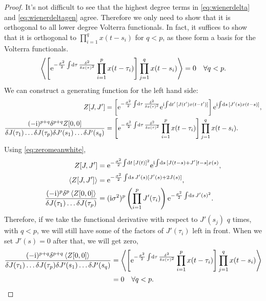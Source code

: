 \documentclass[12pt]{article}
\theoremstyle{slplain}
\theoremstyle{sldefinition}
\theoremstyle{remark}
\begin{document}
\begin{proof}
  It's not difficult to see that the highest degree terms in \eqref{eq:wienerdelta} and \eqref{eq:wienerdeltagen} agree. Therefore we only need to show that it is orthogonal to all lower degree Volterra functionals. In fact, it suffices to show that it is orthogonal to $\prod_{i=1}^q x(t-s_i)$ for $q<p$, as these form a basis for the Volterra functionals.
  \begin{equation}\label{eq:wienerdeltavol}
    \left\langle \left [ \mathrm{e}^{-\frac{\sigma^2}{2}\int\!\mathrm{d} \tau\,\frac{\delta ^2}{\delta x(\tau)^2}} \prod_{i=1}^p x(t-\tau_i) \right ]\prod_{j=1}^q x(t-s_i) \right\rangle = 0 \quad \forall q<p.
  \end{equation}
  We can construct a generating function for the left hand side:
  \begin{equation}\label{eq:wienerdeltavolgen}
    \begin{aligned}
      Z[J,J'] &= \left [ \mathrm{e}^{-\frac{\sigma^2}{2}\int\!\mathrm{d} \tau\,\frac{\delta ^2}{\delta x(\tau)^2}} \mathrm{e}^{\mathrm{i}\!\int\!\mathrm{d} t'\, [J(t') x(t-t')]} \right ] \mathrm{e}^{\mathrm{i}\!\int\!\mathrm{d} s\, [J'(s) x(t-s)]},\\
      \frac{(-\mathrm{i})^{p+q}\delta^{p+q}Z[0,0]}{\delta J(\tau_1)\ldots\delta J(\tau_p) \delta J'(s_1)\ldots\delta J'(s_q)}  &= \left [ \mathrm{e}^{-\frac{\sigma^2}{2}\int\!\mathrm{d} \tau\,\frac{\delta ^2}{\delta x(\tau)^2}} \prod_{i=1}^p x(t-\tau_i) \right ]\prod_{j=1}^q x(t-s_i).
    \end{aligned}
  \end{equation}
  Using \eqref{eq:zeromeanwhite},
  \begin{equation*}
    \begin{aligned}
      Z[J,J'] &= \mathrm{e}^{-\frac{\sigma^2}{2}\!\int\!\mathrm{d} t\, [J(t)]^2} \mathrm{e}^{\mathrm{i}\!\int\!\mathrm{d} s\, [J(t-s)+J'[t-s] x(s)}, \\
       \left\langle Z[J,J'] \right\rangle &= \mathrm{e}^{-\frac{\sigma^2}{2}\int\!\mathrm{d} s\, J'(s)[J'(s)+2J(s)]},\\
       \frac{(-\mathrm{i})^{p}\delta^{p}\left\langle Z[0,0] \right\rangle}{\delta J(\tau_1)\ldots\delta J(\tau_p)}  &= (\mathrm{i}\sigma^2)^p \left ( \prod_{i=1}^p J'(\tau_i) \right )\mathrm{e}^{-\frac{\sigma^2}{2}\int\!\mathrm{d} s\, J'(s)^2}.
    \end{aligned}
  \end{equation*}
  Therefore, if we take the functional derivative with respect to $J'(s_j)$ $q$ times, with $q<p$, we will still have some of the factors of $J'(\tau_i)$ left in front. When we set $J'(s)=0$ after that, we will get zero, \ie
  \begin{equation*}
  \begin{aligned}
    \frac{(-\mathrm{i})^{p+q}\delta^{p+q}\left\langle Z[0,0] \right\rangle}{\delta J(\tau_1)\ldots\delta J(\tau_p) \delta J'(s_1)\ldots\delta J'(s_q)}  &= \left\langle \left [ \mathrm{e}^{-\frac{\sigma^2}{2}\int\!\mathrm{d} \tau\,\frac{\delta ^2}{\delta x(\tau)^2}} \prod_{i=1}^p x(t-\tau_i) \right ]\prod_{j=1}^q x(t-s_i) \right\rangle\\ &= 0 \quad \forall q<p.
  \end{aligned}
  \end{equation*}
\end{proof}
\end{document}
